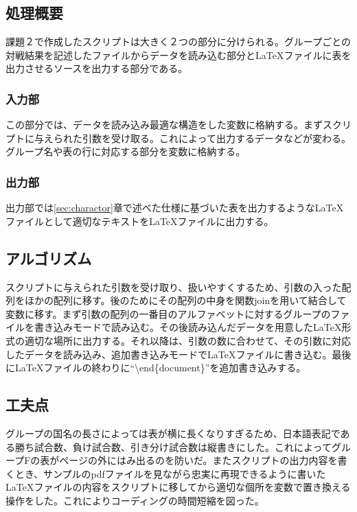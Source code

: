 \documentclass{procreport}
\begin{document}
\subsection{処理概要}
課題２で作成したスクリプトは大きく２つの部分に分けられる。グループごとの対戦結果を記述したファイルからデータを読み込む部分とLaTeXファイルに表を出力させるソースを出力する部分である。

\subsubsection{入力部}
この部分では、データを読み込み最適な構造をした変数に格納する。まずスクリプトに与えられた引数を受け取る。これによって出力するデータなどが変わる。グループ名や表の行に対応する部分を変数に格納する。
\subsubsection{出力部}
出力部では\ref{sec:charactor}章で述べた仕様に基づいた表を出力するようなLaTeXファイルとして適切なテキストをLaTeXファイルに出力する。

\subsection{アルゴリズム}
スクリプトに与えられた引数を受け取り、扱いやすくするため、引数の入った配列をほかの配列に移す。後のためにその配列の中身を関数joinを用いて結合して変数に移す。まず引数の配列の一番目のアルファベットに対するグループのファイルを書き込みモードで読み込む。その後読み込んだデータを用意したLaTeX形式の適切な場所に出力する。それ以降は、引数の数に合わせて、その引数に対応したデータを読み込み、追加書き込みモードでLaTeXファイルに書き込む。最後にLaTeXファイルの終わりに``\textbackslash end\{document\}''を追加書き込みする。

\subsection{工夫点}
グループの国名の長さによっては表が横に長くなりすぎるため、日本語表記である勝ち試合数、負け試合数、引き分け試合数は縦書きにした。これによってグループFの表がページの外にはみ出るのを防いだ。またスクリプトの出力内容を書くとき、サンプルのpdfファイルを見ながら忠実に再現できるように書いたLaTeXファイルの内容をスクリプトに移してから適切な個所を変数で置き換える操作をした。これによりコーディングの時間短縮を図った。
\end{document}
